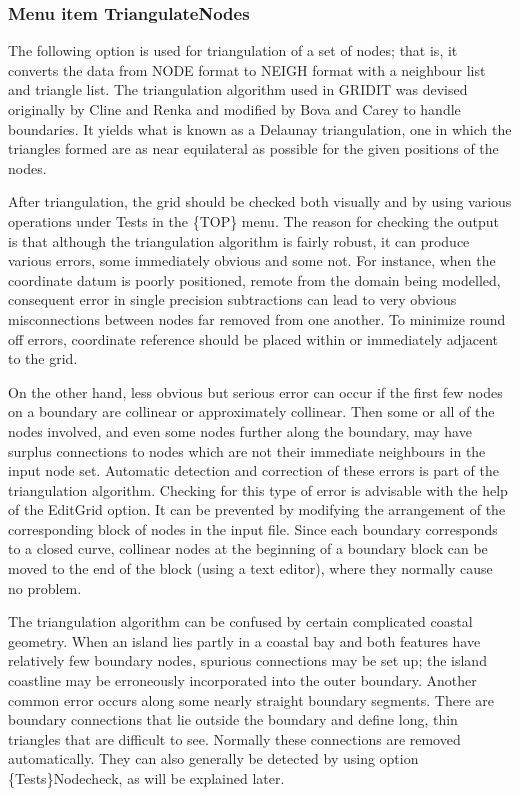 \documentclass{article}
\begin{document}
\subsubsection[Menu item TriangulateNodes]{Menu item TriangulateNodes}
The following option is used for triangulation of a set of nodes; that is, it converts the data from NODE format to NEIGH format with a neighbour list and triangle list. The triangulation algorithm used in GRIDIT was devised originally by Cline and Renka and modified by Bova and Carey to handle boundaries. It yields what is known as a Delaunay triangulation, one in which the triangles formed are as near equilateral as possible for the given positions of the nodes.

After triangulation, the grid should be checked both visually and by using various operations under Tests in the \{TOP\} menu. The reason for checking the output is that although the triangulation algorithm is fairly robust, it can produce various errors, some immediately obvious and some not. For instance, when the coordinate datum is poorly positioned, remote from the domain being modelled, consequent error in single precision subtractions can lead to very obvious misconnections between nodes far removed from one another. To minimize round off errors, coordinate reference should be placed within or immediately adjacent to the grid. 

On the other hand, less obvious but serious error can occur if the first few nodes on a boundary are collinear or approximately collinear. Then some or all of the nodes involved, and even some nodes further along the boundary, may have surplus connections to nodes which are not their immediate neighbours in the input node set. Automatic detection and correction of these errors is part of the triangulation algorithm. Checking for this type of error is advisable with the help of the EditGrid option. It can be prevented by modifying the arrangement of the corresponding block of nodes in the input file. Since each boundary corresponds to a closed curve, collinear nodes at the beginning of a boundary block can be moved to the end of the block (using a text editor), where they normally cause no problem.

The triangulation algorithm can be confused by certain complicated coastal geometry. When an island lies partly in a coastal bay and both features have relatively few boundary nodes, spurious connections may be set up; the island coastline may be erroneously incorporated into the outer boundary. Another common error occurs along some nearly straight boundary segments. There are boundary connections that lie outside the boundary and define long, thin triangles that are difficult to see. Normally these connections are removed automatically. They can also generally be detected by using option \{Tests\}Nodecheck, as will be explained later.
\end{document}
